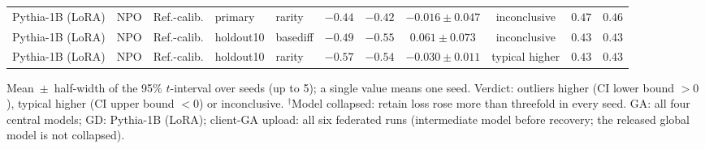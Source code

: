 \begin{table}[t]
\begin{tabular*}{\textwidth}{@{\extracolsep{\fill}}lllllcccccc@{}}
Pythia-1B (LoRA) & NPO & Ref.-calib. & primary & rarity & $-0.44$ & $-0.42$ & $-0.016 \pm 0.047$ & inconclusive & $0.47$ & $0.46$ \\
Pythia-1B (LoRA) & NPO & Ref.-calib. & holdout10 & basediff & $-0.49$ & $-0.55$ & $0.061 \pm 0.073$ & inconclusive & $0.43$ & $0.43$ \\
Pythia-1B (LoRA) & NPO & Ref.-calib. & holdout10 & rarity & $-0.57$ & $-0.54$ & $-0.030 \pm 0.011$ & typical higher & $0.43$ & $0.43$ \\
\bottomrule
\end{tabular*}

\smallskip
{\footnotesize Mean~$\pm$~half-width of the 95\% $t$-interval over seeds (up to 5); a single value means one seed. Verdict: outliers higher (CI lower bound $>0$), typical higher (CI upper bound $<0$) or inconclusive. $^{\dagger}$Model collapsed: retain loss rose more than threefold in every seed. GA: all four central models; GD: Pythia-1B (LoRA); client-GA upload: all six federated runs (intermediate model before recovery; the released global model is not collapsed).\par}
\end{table}
